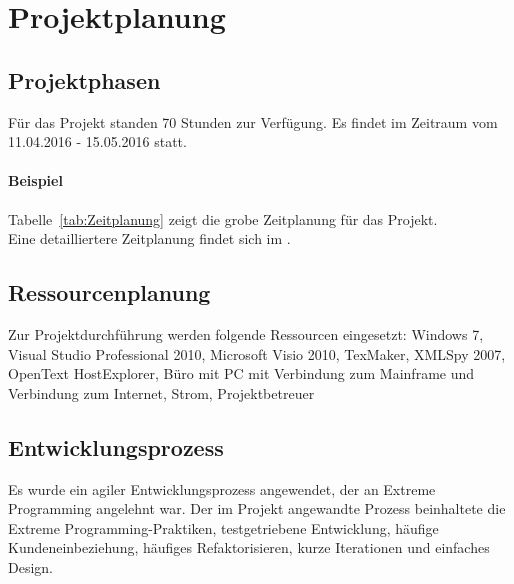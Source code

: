 \section{Projektplanung}
\label{sec:Projektplanung}


\subsection{Projektphasen}
\label{sec:Projektphasen}
Für das Projekt standen 70 Stunden zur Verfügung. Es findet im Zeitraum vom 11.04.2016 - 15.05.2016 statt.

\paragraph{Beispiel}
Tabelle~\ref{tab:Zeitplanung} zeigt die grobe Zeitplanung für das Projekt.
\\
Eine detailliertere Zeitplanung findet sich im .

\subsection{Ressourcenplanung}
\label{sec:Ressourcenplanung}
Zur Projektdurchführung werden folgende Ressourcen eingesetzt:
Windows 7, Visual Studio Professional 2010, Microsoft Visio 2010, TexMaker, XMLSpy 2007, OpenText HostExplorer, Büro mit PC mit Verbindung zum Mainframe und Verbindung zum  Internet, Strom, Projektbetreuer


\subsection{Entwicklungsprozess}
\label{sec:Entwicklungsprozess}
Es wurde ein agiler Entwicklungsprozess angewendet, der an Extreme Programming angelehnt war. Der im Projekt angewandte Prozess beinhaltete die Extreme Programming-Praktiken, testgetriebene Entwicklung, häufige Kundeneinbeziehung, häufiges Refaktorisieren, kurze Iterationen und einfaches Design. 






